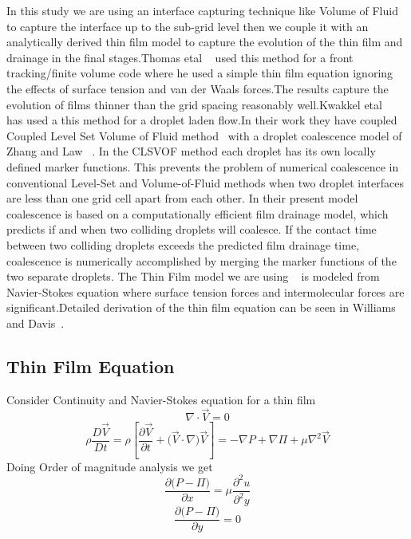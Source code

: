\documentclass[
manuscript=article]{achemso}
\begin{document}
In this study we are using an interface capturing technique like Volume of Fluid to capture the interface up to the sub-grid level then we couple it with an  analytically derived thin film model to capture the evolution of the thin film and drainage in the final stages.Thomas etal ~\cite{4} used this method for a front tracking/finite volume code where he used a simple thin film equation ignoring the effects of surface tension and van der Waals forces.The results capture the evolution of films thinner than the grid spacing reasonably well.Kwakkel etal ~\cite{5} has used a this method for a droplet laden flow.In their work they have coupled Coupled Level Set Volume of Fluid method~\cite{6} with a droplet coalescence model of Zhang and Law ~\cite{7}. In the CLSVOF method each droplet has its own locally defined marker functions. This prevents the problem of numerical coalescence in conventional Level-Set and Volume-of-Fluid methods when two droplet interfaces are less than one grid cell apart from each other. In their present model coalescence is based on a computationally efficient film drainage model, which predicts if and when two colliding droplets will coalesce. If the contact time between two colliding droplets exceeds the predicted film drainage time, coalescence is numerically accomplished by merging the marker functions of the two separate droplets.
The Thin Film model we are using ~\cite{8} is modeled from Navier-Stokes equation where surface tension forces and intermolecular forces are significant.Detailed derivation of the thin film equation can be seen in Williams and Davis~\cite{9}.

\subsection{Thin Film Equation}

Consider Continuity and Navier-Stokes equation for a thin film
\begin{equation}
\nabla \cdot \vec{V} = 0
\end{equation}
\begin{equation}
\rho \frac{D\vec{V}}{Dt} = \rho \left[ \frac{\partial{\vec{V}}}{\partial{t}} + \Big( \vec{V} \cdot \nabla \Big) \vec{V} \right] = -\nabla P + \nabla \Pi + \mu \nabla^{2} \vec{V}
\end{equation}
Doing Order of magnitude analysis we get
\begin{equation}
\frac{\partial{\Big( P - \Pi \Big)}}{\partial{x}} = \mu \frac{\partial^2{u}}{\partial^2{y}}
\end{equation}
\begin{equation}
\frac{\partial{\Big( P - \Pi \Big)}}{\partial{y}} = 0
\end{equation}
\end{document}
